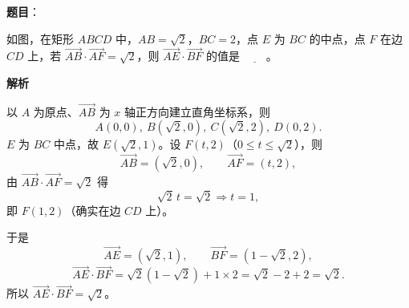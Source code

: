 \begin{answer}

\textbf{题目}：

如图，在矩形 $ABCD$ 中，$AB=\sqrt2$，$BC=2$，点 $E$ 为 $BC$ 的中点，点 $F$ 在边 $CD$ 上，若 $\overrightarrow{AB}\cdot\overrightarrow{AF}=\sqrt2$，则 $\overrightarrow{AE}\cdot\overrightarrow{BF}$ 的值是 $\underline{\qquad}$。
\nopagebreak[4]
\begin{center}\end{center}
\nopagebreak[4]
\textbf{解析}

以 $A$ 为原点、$\overrightarrow{AB}$ 为 $x$ 轴正方向建立直角坐标系，则
\nopagebreak[4]
\[A(0,0),\ B(\sqrt2,0),\ C(\sqrt2,2),\ D(0,2).\]
$E$ 为 $BC$ 中点，故 $E\left(\sqrt2,1\right)$。设 $F(t,2)$（$0\leqslant t\leqslant\sqrt2$），则
\nopagebreak[4]
\[\overrightarrow{AB}=(\sqrt2,0),\qquad\overrightarrow{AF}=(t,2),\]
由 $\overrightarrow{AB}\cdot\overrightarrow{AF}=\sqrt2$ 得
\nopagebreak[4]
\[\sqrt2\,t=\sqrt2\Longrightarrow t=1,\]
即 $F(1,2)$（确实在边 $CD$ 上）。

于是
\nopagebreak[4]
\[\overrightarrow{AE}=\left(\sqrt2,1\right),\qquad\overrightarrow{BF}=\left(1-\sqrt2,2\right),\]
\nopagebreak[4]
\[\overrightarrow{AE}\cdot\overrightarrow{BF}=\sqrt2\left(1-\sqrt2\right)+1\times2=\sqrt2-2+2=\sqrt2.\]
所以 $\overrightarrow{AE}\cdot\overrightarrow{BF}=\sqrt2$。


\end{answer}
